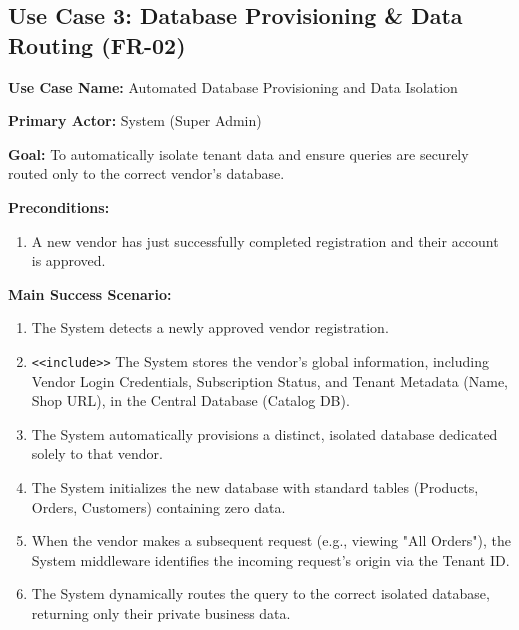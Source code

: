 \subsection*{Use Case 3: Database Provisioning \& Data Routing (FR-02)}

\textbf{Use Case Name:} Automated Database Provisioning and Data Isolation

\textbf{Primary Actor:} System (Super Admin)

\textbf{Goal:} To automatically isolate tenant data and ensure queries are securely routed only to the correct vendor's database.

\textbf{Preconditions:}
\begin{enumerate}
    \item A new vendor has just successfully completed registration and their account is approved.
\end{enumerate}

\textbf{Main Success Scenario:}
\begin{enumerate}
    \item The System detects a newly approved vendor registration.
    
    \item \texttt{\textless\textless include\textgreater\textgreater} The System stores the vendor's global information, including Vendor Login Credentials, Subscription Status, and Tenant Metadata (Name, Shop URL), in the Central Database (Catalog DB).
    
    \item The System automatically provisions a distinct, isolated database dedicated solely to that vendor.
    
    \item The System initializes the new database with standard tables (Products, Orders, Customers) containing zero data.
    
    \item When the vendor makes a subsequent request (e.g., viewing "All Orders"), the System middleware identifies the incoming request's origin via the Tenant ID.
    
    \item The System dynamically routes the query to the correct isolated database, returning only their private business data.
\end{enumerate}

